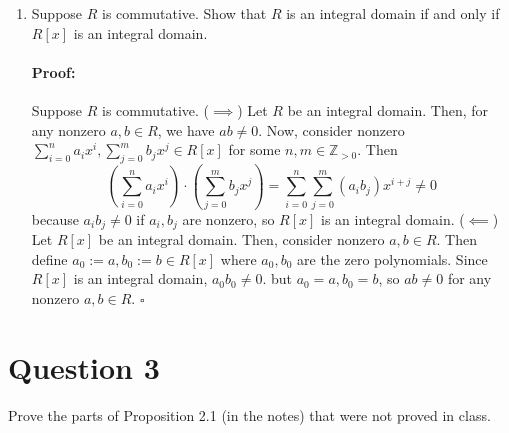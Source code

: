 \documentclass [12pt] {article}
\newcommand{\Z}{\mathbb{Z}}
\newenvironment{proof}{\paragraph{Proof:}}{\hfill$\square$}
\begin{document}
\begin{enumerate}
    \item Suppose $R$ is commutative. Show that $R$ is an integral domain if and only if $R[x]$ 
        is an integral domain. \vspace{-12pt}

        \begin{proof}
            Suppose $R$ is commutative.
            \newline
            ($\implies$) Let $R$ be an integral domain. Then, for any nonzero $a, b \in R$, we
            have $ab \neq 0$. Now, consider nonzero
            $\sum^{n}_{i = 0} a_i x^i, \sum^{m}_{j = 0} b_j x^j \in R[x]$ for some 
            $n, m \in \Z_{> 0}$. Then
            \[
                \left( \sum^{n}_{i = 0} a_i x^i \right) 
                \cdot 
                \left (\sum^{m}_{j = 0} b_j x^j \right)
                = \sum^{n}_{i = 0} \sum^{m}_{j = 0} (a_i b_j) x^{i + j} \neq 0
            \]
            because $a_i b_j \neq 0$ if $a_i, b_j$ are nonzero, so $R[x]$ is an integral domain.
            \newline
            ($\impliedby$) Let $R[x]$ be an integral domain. Then, consider nonzero
            $a, b \in R$. Then define $a_0 := a, b_0 := b \in R[x]$ where $a_0, b_0$ are the zero
            polynomials. Since $R[x]$ is an integral domain, $a_0 b_0 \neq 0$. but 
            $a_0 = a, b_0 = b$, so $ab \neq 0$ for any nonzero $a, b \in R$.
        \end{proof}
\end{enumerate}
\newpage

\section*{Question 3}
Prove the parts of Proposition 2.1 (in the notes) that were not proved in class. 
\end{document}
